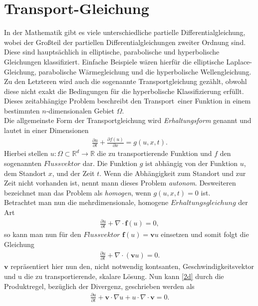 \documentclass[12pt,titlepage]{article}
\begin{document}
\section{Transport-Gleichung}\label{sec:transglei}
In der Mathematik gibt es viele unterschiedliche partielle Differentialgleichung, wobei der Großteil der partiellen Differentialgleichungen zweiter Ordnung sind. Diese sind hauptsächlich in elliptische, parabolische und hyperbolische Gleichungen klassifiziert. Einfache Beispiele wären hierfür die elliptische Laplace-Gleichung, parabolische Wärmegleichung und die hyperbolische Wellengleichung. Zu den Letzteren wird auch die sogenannte Transportgleichung gezählt, obwohl diese nicht exakt die Bedingungen für die hyperbolische Klassifizierung erfüllt. Dieses zeitabhängige Problem beschreibt den \grqq Transport\grqq~einer Funktion in einem bestimmten $n$-dimensionalen Gebiet $\Omega$.\\
Die allgemeinste Form der Transportgleichung wird \textit{Erhaltungsform} genannt und lautet in einer Dimensionen
\begin{align}
 \frac{\partial u}{\partial t}+\frac{\partial f(u)}{\partial x}=g(u,x,t)\label{1d}.
\end{align}
Hierbei stellen $u:\Omega\subset\mathbb{R}^d\to\mathbb{R}$ die zu transportierende Funktion und $f$ den sogenannten $Flussvektor$ dar. Die Funktion $g$ ist abhängig von der Funktion $u$, dem Standort $x$, und der Zeit $t$. Wenn die Abhängigkeit zum Standort und zur Zeit nicht vorhanden ist, nennt mann dieses Problem \textit{autonom}. Desweiteren bezeichnet man das Problem als \textit{homogen}, wenn $g(u,x,t)=0$ ist.\\
Betrachtet man nun die mehrdimensionale, homogene $Erhaltungsgleichung$ der Art
\begin{align}
 \frac{\partial u}{\partial t}+\nabla\cdot\textbf{f}(u)=0,
\end{align}
so kann man nun für den $Flussvektor$ $\textbf{f}(u)=\textbf{v} u$ einsetzen und somit folgt die Gleichung
\begin{align}
 \frac{\partial u}{\partial t}+\nabla \cdot (\textbf{v}u)=0.\label{2d}
\end{align}
$\textbf{v}$ repräsentiert hier nun den, nicht notwendig kontsanten, Geschwindigkeitsvektor und u die zu transportierende, skalare Lösung. Nun kann \eqref{2d} durch die Produktregel, bezüglich der Divergenz, geschrieben werden als
\begin{align}
  \frac{\partial u}{\partial t}+\textbf{v}\cdot\nabla u + u \cdot \nabla \cdot\textbf{v}=0.
\end{align}
\end{document}
